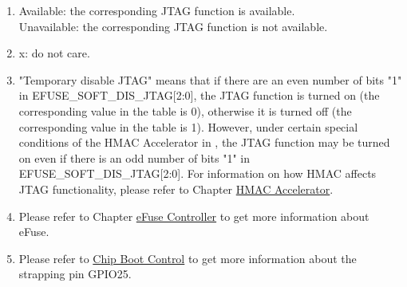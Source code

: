 \begin{tiplisting}
\vspace{-2em}
\begin{enumerate}
\item \label{JTAG footnote: 1}
    Available: the corresponding JTAG function is available. \\
    Unavailable: the corresponding JTAG function is not available.
\item \label{JTAG footnote: 2}
    x: do not care.
\item \label{JTAG footnote: 3}
    "Temporary disable JTAG"  means that if there are an even number of bits "1" in EFUSE\_SOFT\_DIS\_JTAG[2:0], the JTAG function is turned on (the corresponding value in the table is 0), otherwise it is turned off (the corresponding value in the table is 1). However, under certain special conditions of the HMAC Accelerator in \chipname{}, the JTAG function may be turned on even if there is an odd number of bits "1" in EFUSE\_SOFT\_DIS\_JTAG[2:0].
    For information on how HMAC affects JTAG functionality, please refer to Chapter \hyperref[mod:hmac]{HMAC Accelerator}.
\item \label{JTAG footnote: 4}
    Please refer to Chapter \hyperref[mod:efuse]{eFuse Controller} to get more information about eFuse.
\item \label{JTAG footnote: 5}
    Please refer to \hyperref[mod:bootctrl]{Chip Boot Control} to get more information about the strapping pin GPIO25.
\end{enumerate}
\end{tiplisting}
